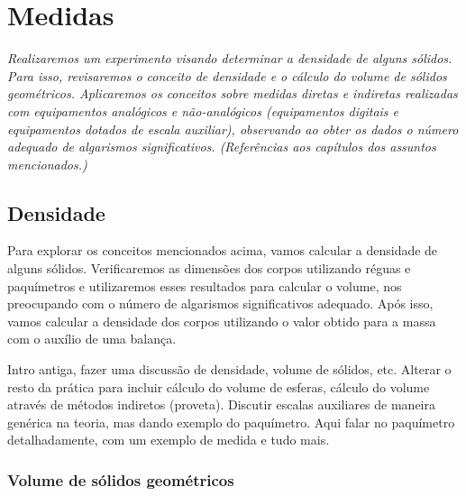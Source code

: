 \chapter{Medidas}
\label{Chap:ExpMedidas}

\begin{fullwidth}\it
	Realizaremos um experimento visando determinar a densidade de alguns sólidos. Para isso, revisaremos o conceito de densidade e o cálculo do volume de sólidos geométricos. Aplicaremos os conceitos sobre medidas diretas e indiretas realizadas com equipamentos analógicos e não-analógicos (equipamentos digitais e equipamentos dotados de escala auxiliar), observando ao obter os dados o número adequado de algarismos significativos. (Referências aos capítulos dos assuntos mencionados.) 
\end{fullwidth}

\section{Densidade}

Para explorar os conceitos mencionados acima, vamos calcular a densidade de alguns sólidos. Verificaremos as dimensões dos corpos utilizando réguas e paquímetros e utilizaremos esses resultados para calcular o volume, nos preocupando com o número de algarismos significativos adequado. Após isso, vamos calcular a densidade dos corpos utilizando o valor obtido para a massa com o auxílio de uma balança.

Intro antiga, fazer uma discussão de densidade, volume de sólidos, etc. Alterar o resto da prática para incluir cálculo do volume de esferas, cálculo do volume através de métodos indiretos (proveta). Discutir escalas auxiliares de maneira genérica na teoria, mas dando exemplo do paquímetro. Aqui falar no paquímetro detalhadamente, com um exemplo de medida e tudo mais.

\subsection{Volume de sólidos geométricos}

